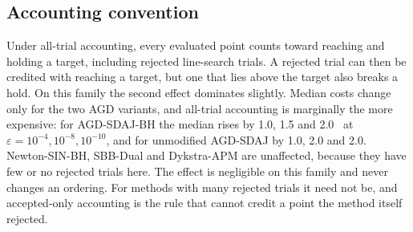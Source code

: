 \subsection{Accounting convention}\label{sec:acct-results}
Under all-trial accounting, every evaluated point counts toward reaching and
holding a target, including rejected line-search trials. A rejected trial can
then be credited with reaching a target, but one that lies above the target
also breaks a hold. On this family the second effect dominates slightly.
Median costs change only for the two AGD variants, and all-trial accounting
is marginally the more expensive: for AGD-SDAJ-BH the median rises by 1.0, 1.5
and 2.0 \EVDs\ at $\varepsilon=10^{-4},10^{-8},10^{-10}$, and for unmodified
AGD-SDAJ by 1.0, 2.0 and 2.0.
Newton-SIN-BH, SBB-Dual and Dykstra-APM are unaffected, because they have few
or no rejected trials here. The effect is negligible on this family and never
changes an ordering. For methods with many rejected trials it need not be,
and accepted-only accounting is the rule that cannot credit a point the method
itself rejected.

